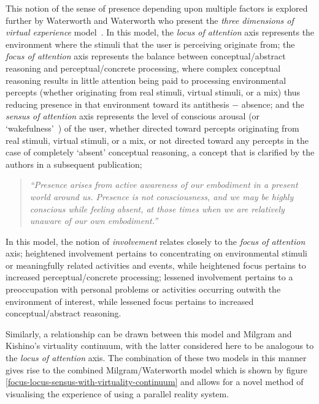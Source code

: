 This notion of the sense of presence depending upon multiple factors is explored further by Waterworth and Waterworth who present the \textit{three dimensions of virtual experience} model~\cite{Waterworth2001}. In this model, the \textit{locus of attention} axis represents the environment where the stimuli that the user is perceiving originate from; the \textit{focus of attention} axis represents the balance between conceptual/abstract reasoning and perceptual/concrete processing, where complex conceptual reasoning results in little attention being paid to processing environmental percepts (whether originating from real stimuli, virtual stimuli, or a mix) thus reducing presence\presencefootnote{} in that environment toward its antithesis $-$ absence\absencefootnote{}; and the \textit{sensus of attention} axis represents the level of conscious arousal (or `wakefulness'~\cite{Laureys2009}) of the user, whether directed toward percepts originating from real stimuli, virtual stimuli, or a mix, or not directed toward any percepts in the case of completely `absent' conceptual reasoning, a concept that is clarified by the authors in a subsequent publication;

\begin{quote}
	\textit{``Presence arises from active awareness of our embodiment in a present world around us. Presence is not consciousness, and we may be highly conscious while feeling absent, at those times when we are relatively unaware of our own embodiment.''}~\cite{Waterworth2014}
\end{quote}

In this model, the notion of \textit{involvement} relates closely to the \textit{focus of attention} axis; heightened involvement pertains to concentrating on environmental stimuli or meaningfully related activities and events, while heightened focus pertains to increased perceptual/concrete processing; lessened involvement pertains to a preoccupation with personal problems or activities occurring outwith the environment of interest, while lessened focus pertains to increased conceptual/abstract reasoning.

Similarly, a relationship can be drawn between this model and Milgram and Kishino's virtuality continuum, with the latter considered here to be analogous to the \textit{locus of attention} axis. The combination of these two models in this manner gives rise to the combined Milgram/Waterworth model which is shown by figure \ref{focus-locus-sensus-with-virtuality-continuum} and allows for a novel method of visualising the experience of using a parallel reality system.


